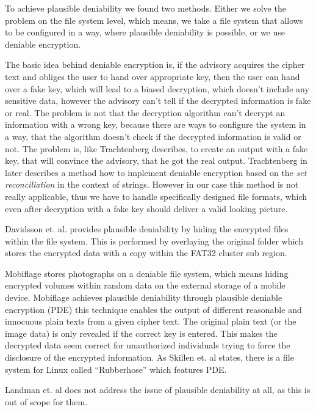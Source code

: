 \documentclass[12pt,a4paper,titlepage,oneside]{scrartcl}
\begin{document}
To achieve plausible deniability we found two methods.
Either we solve the problem on the file system level, which means, we take a file system that allows to be configured in a way, where plausible deniability is possible, or we use deniable encryption.

The basic idea behind deniable encryption is, if the advisory acquires the cipher text and obliges the user to hand over appropriate key, then the user can hand over a fake key, which will lead to a biased decryption, which doesn't include any sensitive data, however the advisory can't tell if the decrypted information is fake or real. \cite{canetti1997deniable}
The problem is not that the decryption algorithm can't decrypt an information with a wrong key, because there are ways to configure the system in a way, that the algorithm doesn't check if the decrypted information is valid or not.
The problem is, like Trachtenberg describes, to create an output with a fake key, that will convince the advisory, that he got the real output. \cite{trachtenbergsay}
Trachtenberg in \cite{trachtenbergsay} later describes a method how to implement deniable encryption based on the \textit{set reconciliation} in the context of strings.
However in our case this method is not really applicable, thus we have to handle specifically designed file formats, which even after decryption with a fake key should deliver a valid looking picture.

Davidsson et. al. provides plausible deniability by hiding the encrypted files within the file system.
This is performed by overlaying the original folder which stores the encrypted data with a copy within the FAT32 cluster sub region. \cite{Davidsson2016}

Mobiflage stores photographs on a deniable file system, which means hiding encrypted volumes within random data on the external storage of a mobile device.
Mobiflage achieves plausible deniability through plausible deniable encryption (PDE) this technique enables the output of different reasonable and innocuous plain texts from a given cipher text.
The original plain text (or the image data) is only revealed if the correct key is entered.
This makes the decrypted data seem correct for unauthorized individuals trying to force the disclosure of the encrypted information.
As Skillen et. al states, there is a file system for Linux called ``Rubberhose'' which features PDE.

Landman et. al \cite{pmid25565678} does not address the issue of plausible deniability at all, as this is out of scope for them.
\end{document}
